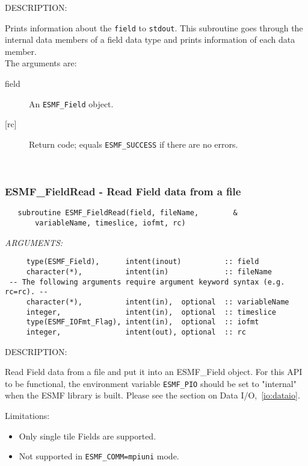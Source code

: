 {\sf DESCRIPTION:\\ }


       Prints information about the {\tt field} to {\tt stdout}.
       This subroutine goes through the internal data members of a field
       data type and prints information of each data member. \\
  
       The arguments are:
       \begin{description}
       \item [field]
             An {\tt ESMF\_Field} object.
       \item [{[rc]}]
             Return code; equals {\tt ESMF\_SUCCESS} if there are no errors.
       \end{description}
   
 
\mbox{}\hrulefill\ 
 
\subsubsection [ESMF\_FieldRead] {ESMF\_FieldRead - Read Field data from a file}


   \label{api:FieldRead}
 
\begin{verbatim}   subroutine ESMF_FieldRead(field, fileName,        &
       variableName, timeslice, iofmt, rc)\end{verbatim}{\em ARGUMENTS:}
\begin{verbatim}     type(ESMF_Field),      intent(inout)          :: field
     character(*),          intent(in)             :: fileName
 -- The following arguments require argument keyword syntax (e.g. rc=rc). --
     character(*),          intent(in),  optional  :: variableName
     integer,               intent(in),  optional  :: timeslice
     type(ESMF_IOFmt_Flag), intent(in),  optional  :: iofmt
     integer,               intent(out), optional  :: rc\end{verbatim}
{\sf DESCRIPTION:\\ }


     Read Field data from a file and put it into an {ESMF\_Field} object.
     For this API to be functional, the environment variable {\tt ESMF\_PIO}
     should be set to "internal" when the ESMF library is built.
     Please see the section on Data I/O,~\ref{io:dataio}.
  
     Limitations:
     \begin{itemize}
       \item Only single tile Fields are supported.
       \item Not supported in {\tt ESMF\_COMM=mpiuni} mode.
     \end{itemize}
  
